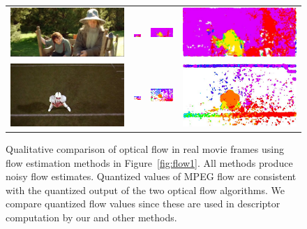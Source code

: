 \documentclass[10pt,twocolumn,letterpaper]{article}
\begin{document}
\begin{figure}[t!]
\begin{center}
\begin{tabular}{cccc}
\includegraphics[width=.23\textwidth]{figures/flow/flow_actioncliptest00538_frame014.jpeg} & 
\includegraphics[width=.23\textwidth]{figures/flow/flow_actioncliptest00538_frame014_mv_quant.png} & 
\includegraphics[width=.23\textwidth]{figures/flow/flow_actioncliptest00538_frame014_stip_quant.png} & 
\includegraphics[width=.23\textwidth]{figures/flow/flow_actioncliptest00538_frame014_traj_quant.jpeg} \\
\includegraphics[width=.23\textwidth]{figures/flow/flow_actioncliptest00870_frame013.jpeg} & 
\includegraphics[width=.23\textwidth]{figures/flow/flow_actioncliptest00870_frame014_mv_quant.png} & 
\includegraphics[width=.23\textwidth]{figures/flow/flow_actioncliptest00870_frame013_stip_quant.png} & 
\includegraphics[width=.23\textwidth]{figures/flow/flow_actioncliptest00870_frame013_traj_quant.jpeg} \vspace{.2cm}\\
\end{tabular}
\caption{Qualitative comparison of optical flow in real movie frames using flow estimation methods in Figure~\ref{fig:flow1}. All methods produce noisy flow estimates. Quantized values of MPEG flow are consistent with the quantized output of the two optical flow algorithms. We compare quantized flow values since these are used in descriptor computation by our and other methods.\vspace{-.3cm}}
\label{fig:flow2}
\end{center}
\end{figure}
\end{document}
